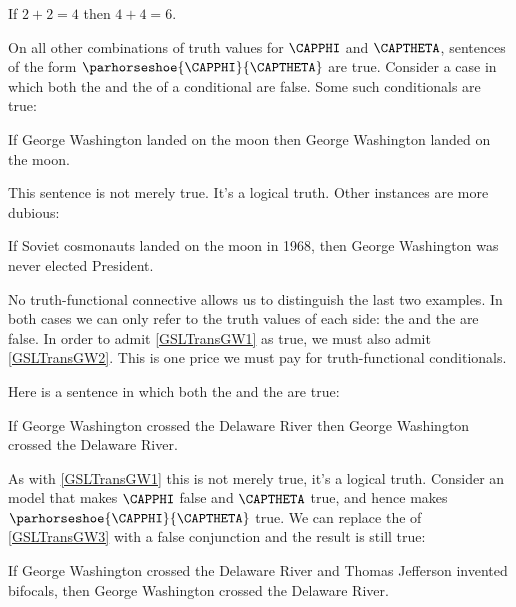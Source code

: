 \begin{menumerate}
	\item If $2+2=4$ then $4+4=6$.
\end{menumerate}

\noindent{}On all other combinations of truth values for $\CAPPHI$ and $\CAPTHETA$, \GSL{} sentences of the form $\parhorseshoe{\CAPPHI}{\CAPTHETA}$ are true.
Consider a case in which both the  and the  of a conditional are false.
Some such conditionals are true:

\begin{menumerate}
	\item\label{GSLTransGW1} If George Washington landed on the moon then George Washington landed on the moon.
\end{menumerate}

\noindent{}This sentence is not merely true. It's a logical truth.
Other instances are more dubious: 

\begin{menumerate}
	\item\label{GSLTransGW2} If Soviet cosmonauts landed on the moon in 1968, then George Washington was never elected President.
\end{menumerate}

\noindent{}No truth-functional connective allows us to distinguish the last two examples.
In both cases we can only refer to the truth values of each side: the  and the  are false.
In order to admit \ref{GSLTransGW1} as true, we must also admit \ref{GSLTransGW2}.
This is one price we must pay for truth-functional conditionals.

Here is a sentence in which both the  and the  are true:

\begin{menumerate}
	\item\label{GSLTransGW3} If George Washington crossed the Delaware River then George Washington crossed the Delaware River.
\end{menumerate}

\noindent{}As with \ref{GSLTransGW1} this is not merely true, it's a logical truth.
Consider an \GSL{} model that makes $\CAPPHI$ false and $\CAPTHETA$ true, and hence makes $\parhorseshoe{\CAPPHI}{\CAPTHETA}$ true.
We can replace the  of \ref{GSLTransGW3} with a false conjunction and the result is still true:

\begin{menumerate}
	\item If George Washington crossed the Delaware River and Thomas Jefferson invented bifocals, then George Washington crossed the Delaware River.
\end{menumerate}

